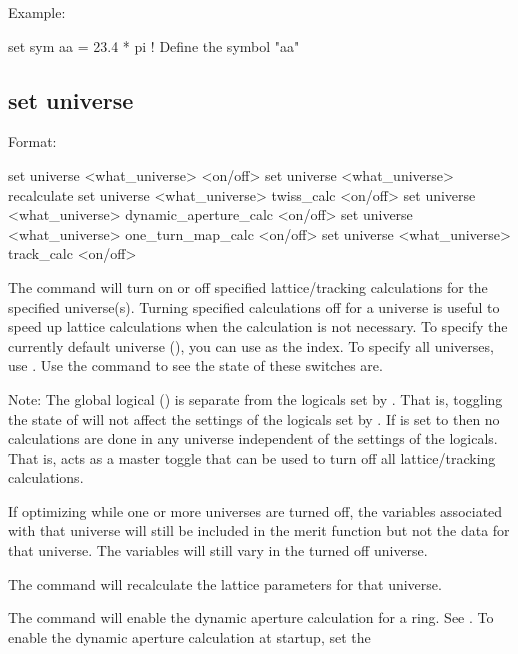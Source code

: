 {{{{{Example:
\begin{example}
  set sym aa = 23.4 * pi  ! Define the symbol "aa"
\end{example}


\subsection{set universe}
\label{s:set.universe}

Format:
\begin{example}
  set universe <what_universe> <on/off>
  set universe <what_universe> recalculate
  set universe <what_universe> twiss_calc <on/off>
  set universe <what_universe> dynamic_aperture_calc <on/off>
  set universe <what_universe> one_turn_map_calc <on/off>
  set universe <what_universe> track_calc <on/off>
\end{example}

The  command will turn on or off specified lattice/tracking
calculations for the specified universe(s). Turning specified calculations off for a universe is
useful to speed up lattice calculations when the calculation is not necessary. To specify the
currently default universe (), you can use  as the 
index. To specify all universes, use \vn{*}. Use the  command to see the state of
these switches are.

Note: The global logical  () is separate from the logicals set
by . That is, toggling the state of  will not affect the
settings of the logicals set by . If  is set to  then
no calculations are done in any universe independent of the settings of the 
logicals. That is,  acts as a master toggle that can be used to turn off all
lattice/tracking calculations.

If optimizing while one or more universes are turned off, the variables associated with
that universe will still be included in the merit function but not the data for that
universe. The variables will still vary in the turned off universe.

The  command will recalculate the lattice
parameters for that universe.

The  command will enable the
dynamic aperture calculation for a ring. See . To enable the
dynamic aperture calculation at startup, set the \vn{design_lattice(i)%
component (\sref{s:init.lat}).

}}}}}}
